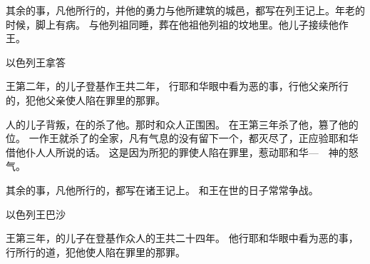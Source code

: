 {其余的事，凡他所行的，并他的勇力与他所建筑的城邑，都写在{}列王记上。{}年老的时候，脚上有病。
与他列祖同睡，葬在他祖{}他列祖的坟地里。他儿子{}接续他作王。
\par }{\SH 以色列王拿答
\par }{\PP {}王{}第二年，{}的儿子{}登基作{}王共二年，
行耶和华眼中看为恶的事，行他父亲所行的，犯他父亲使{}人陷在罪里的那罪。
\par }{\PP {}人{}的儿子{}背叛{}，在{}的{}杀了他。那时{}和{}众人正围困{}。
在{}王{}第三年{}杀了他，篡了他的位。
一作王就杀了{}的全家，凡有气息的没有留下一个，都灭尽了，正应验耶和华借他仆人{}人{}所说的话。
这是因为{}所犯的罪使{}人陷在罪里，惹动耶和华—{}　神的怒气。
\par }{\PP {}其余的事，凡他所行的，都写在{}诸王记上。
和{}王{}在世的日子常常争战。
\par }{\SH 以色列王巴沙
\par }{\PP {}王{}第三年，{}的儿子{}在{}登基作{}众人的王共二十四年。
他行耶和华眼中看为恶的事，行{}所行的道，犯他使{}人陷在罪里的那罪。

}
